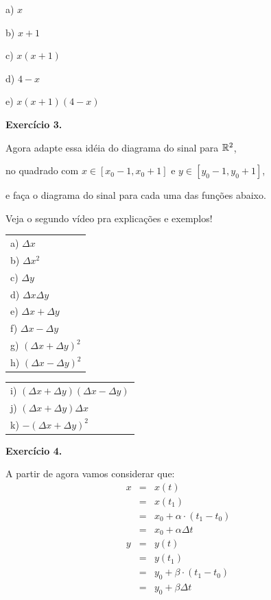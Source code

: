 \documentclass[oneside,12pt]{article}
\begin{document}
a) $x$

b) $x+1$

c) $x(x+1)$

d) $4-x$

e) $x(x+1)(4-x)$

\newpage


{\bf Exercício 3.}

Agora adapte essa idéia do diagrama do sinal para $\mathbb{R}^2$,

no quadrado com $x∈[x_0-1,x_0+1]$ e $y∈[y_0-1,y_0+1]$,

e faça o diagrama do sinal para cada uma das funções abaixo.

Veja o segundo vídeo pra explicações e exemplos!

\msk

\begin{tabular}[t]{l}
a) $Δx$   \\
b) $Δx^2$ \\
c) $Δy$   \\
d) $ΔxΔy$ \\
e) $Δx+Δy$ \\
f) $Δx-Δy$ \\
g) $(Δx+Δy)^2$ \\
h) $(Δx-Δy)^2$ \\
\end{tabular}
\quad
\begin{tabular}[t]{l}
i) $(Δx+Δy)(Δx-Δy)$ \\
j) $(Δx+Δy)Δx$ \\
k) $-(Δx+Δy)^2$ \\
\end{tabular}


\newpage


{\bf Exercício 4.}

A partir de agora vamos considerar que:
%
$$\begin{array}{rcl}
  x &=& x(t) \\
    &=& x(t_1) \\
    &=& x_0 + α·(t_1-t_0) \\
    &=& x_0 + αΔt \\
  y &=& y(t) \\
    &=& y(t_1) \\
    &=& y_0 + β·(t_1-t_0) \\
    &=& y_0 + βΔt \\
  \end{array}
$$
\end{document}
